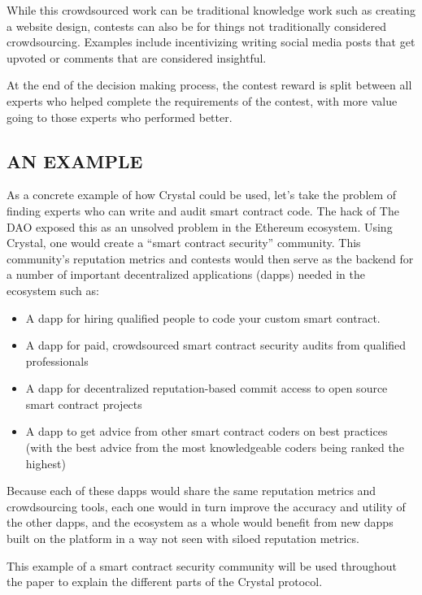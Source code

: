 While this crowdsourced work can be traditional knowledge work such as
creating a website design, contests can also be for things not
traditionally considered crowdsourcing. Examples include incentivizing
writing social media posts that get upvoted or comments that are
considered insightful.

At the end of the decision making process, the contest reward is split
between all experts who helped complete the requirements of the contest,
with more value going to those experts who performed better.

\subsection{\texorpdfstring{\protect\hypertarget{_enss86h4mfgg}{}{\protect\hypertarget{_Toc462050406}{}{}}AN
EXAMPLE}{AN EXAMPLE}}\label{an-example}

As a concrete example of how Crystal could be used, let's take the
problem of finding experts who can write and audit smart contract code.
The hack of The DAO exposed this as an unsolved problem in the Ethereum
ecosystem. Using Crystal, one would create a ``smart contract security''
community. This community's reputation metrics and contests would then
serve as the backend for a number of important decentralized
applications (dapps) needed in the ecosystem such as:

\begin{itemize}
\item
  A dapp for hiring qualified people to code your custom smart contract.
\item
  A dapp for paid, crowdsourced smart contract security audits from
  qualified professionals
\item
  A dapp for decentralized reputation-based commit access to open source
  smart contract projects
\item
  A dapp to get advice from other smart contract coders on best
  practices (with the best advice from the most knowledgeable coders
  being ranked the highest)
\end{itemize}

Because each of these dapps would share the same reputation metrics and
crowdsourcing tools, each one would in turn improve the accuracy and
utility of the other dapps, and the ecosystem as a whole would benefit
from new dapps built on the platform in a way not seen with siloed
reputation metrics.

This example of a smart contract security community will be used
throughout the paper to explain the different parts of the Crystal
protocol.

